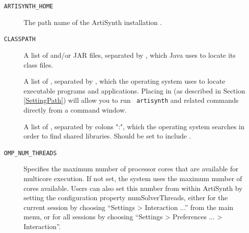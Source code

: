 \begin{description}

\item[{\tt ARTISYNTH\_HOME}]\mbox{}
 
The path name of the ArtiSynth installation \directory{}.

%

\item[{\tt CLASSPATH}]\mbox{}

A list of \directories{} and/or JAR files, separated by
\separatorDesc, which Java uses to locate its class files.

\item[\PATH{}]\mbox{}
 
A list of \directories{}, separated by \separatorDesc, which the
operating system uses to locate executable programs and
applications. Placing  in \PATH{} (as
described in Section \ref{SettingPath}) will allow you to run {\tt
artisynth} and related commands directly from a command window.

\ifNeedLibraryPath
\ifWindows\else %
\item[\LIBRARYPATH{}]\mbox{}

A list of \directories{}, separated by colons
":", which the operating system searches in order to find shared libraries.
Should be set to include .
\fi %
\fi %

\item[{\tt OMP\_NUM\_THREADS}]\mbox{}
 
Specifies the maximum number of processor cores that are available for
multicore execution. If not set, the system uses the
maximum number of cores available. Users can also set this number from
within ArtiSynth by setting the configuration property {\sf
numSolverThreads}, either for the current session by choosing {\sf
``Settings > Interaction ...''} from the main menu, or for all sessions by
choosing {\sf ``Settings > Preferences ... > Interaction''}.

\end{description}

